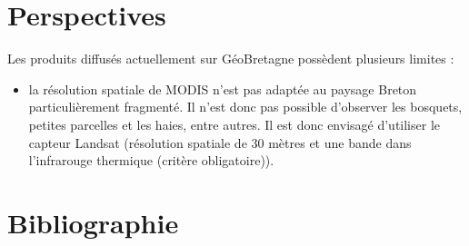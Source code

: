 \documentclass[10pt,a4paper]{article}
\begin{document}
\section{Perspectives}

Les produits diffusés actuellement sur GéoBretagne possèdent plusieurs limites :
\begin{itemize}
\item la résolution spatiale de MODIS n'est pas adaptée au paysage Breton particulièrement fragmenté. Il n'est donc pas possible d'observer les bosquets, petites parcelles et les haies, entre autres. Il est donc envisagé d'utiliser le capteur Landsat (résolution spatiale de 30 mètres et une bande dans l'infrarouge thermique (critère obligatoire)).
\end{itemize}

\section{Bibliographie}
\end{document}

